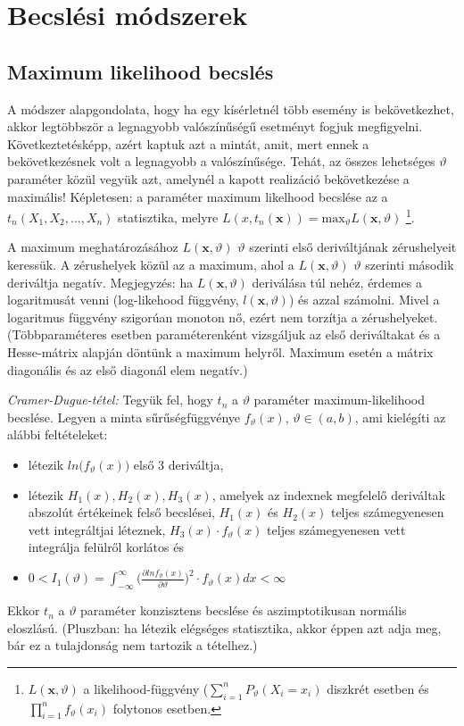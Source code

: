 \chapter{Becslési módszerek}

\section{Maximum likelihood becslés}

A módszer alapgondolata, hogy ha egy kísérletnél több esemény is bekövetkezhet, akkor legtöbbször a legnagyobb valószínűségű esetményt fogjuk megfigyelni. Következtetésképp, azért kaptuk azt a mintát, amit, mert ennek a bekövetkezésnek volt a legnagyobb a valószínűsége. Tehát, az összes lehetséges $\vartheta$ paraméter közül vegyük azt, amelynél a kapott realizáció bekövetkezése a maximális! Képletesen: a paraméter maximum likelhood becslése az a $t_n(X_1,X_2, ..., X_n)$ statisztika, melyre $L(x,t_n(\mathbf{x})) = \text{max}_\vartheta L(\mathbf{x}, \vartheta)$ \footnote{$L(\mathbf{x}, \vartheta)$ a likelihood-függvény ($\sum_{i=1}^nP_\vartheta(X_i=x_i)$ diszkrét esetben és $\prod_{i=1}^nf_\vartheta(x_i)$ folytonos esetben.}.

A maximum meghatározásához $L(\mathbf{x}, \vartheta)$ $\vartheta$ szerinti első deriváltjának zérushelyeit keressük. A zérushelyek közül az a maximum, ahol a $L(\mathbf{x}, \vartheta)$ $\vartheta$ szerinti második deriváltja negatív. Megjegyzés: ha $L(\mathbf{x}, \vartheta)$ deriválása túl nehéz, érdemes a logaritmusát venni (log-likehood függvény, $l(\mathbf{x}, \vartheta)$) és azzal számolni. Mivel a logaritmus függvény szigorúan monoton nő, ezért nem torzítja a zérushelyeket. (Többparaméteres esetben paraméterenként vizsgáljuk az első deriváltakat és a Hesse-mátrix alapján döntünk a maximum helyről. Maximum esetén a mátrix diagonális és az első diagonál elem negatív.)

\emph{Cramer-Dugue-tétel:} Tegyük fel, hogy $t_n$ a $\vartheta$ paraméter maximum-likelihood becslése. Legyen a minta sűrűségfüggvénye $f_\vartheta(x)$, $\vartheta \in (a,b)$, ami kielégíti az alábbi feltételeket:
\begin{itemize}
\item létezik $ln \big(f_\vartheta(x) \big)$ első 3 deriváltja,
\item létezik $H_1(x), H_2(x), H_3(x)$, amelyek az indexnek megfelelő deriváltak abszolút értékeinek felső becslései, $H_1(x)$ és $H_2(x)$ teljes számegyenesen vett integráltjai léteznek, $H_3(x) \cdot f_\vartheta(x)$ teljes számegyenesen vett integrálja felülről korlátos és
\item $0<I_1(\vartheta)=\int_{- \infty}^{\infty} \big(\frac{\partial ln f_\vartheta(x)}{\partial \vartheta}\big)^2 \cdot f_\vartheta(x) dx < \infty$
\end{itemize}
Ekkor $t_n$ a $\vartheta$ paraméter konzisztens becslése és aszimptotikusan normális eloszlású. (Pluszban: ha létezik elégséges statisztika, akkor éppen azt adja meg, bár ez a tulajdonság nem tartozik a tételhez.)

